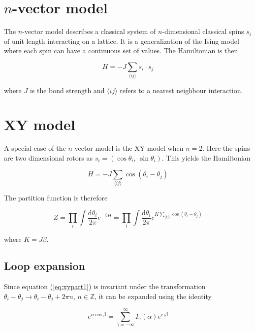 \section{$n$-vector model}
\label{sec:nVector}

The $n$-vector model describes a classical system of $n$-dimensional classical spins $s_i$ of unit length interacting on a lattice. It is a generalization of the Ising model where each spin can have a continuous set of values. The Hamiltonian is then

\begin{equation}
    H = -J\sum_{\langle ij \rangle} s_i \cdot s_j
\end{equation}

where $J$ is the bond strength and $\langle ij \rangle$ refers to a nearest neighbour interaction.

\section{XY model}
\label{sec:XYModel}

A special case of the $n$-vector model is the XY model when $n = 2$. Here the spins are two dimensional rotors as $s_i = (\cos \theta_i, \  \sin \theta_i)$. This yields the Hamiltonian

\begin{equation}
    H = - J \sum_{\langle ij \rangle} \cos(\theta_i - \theta_j)
\label{eq:xymodel}
\end{equation}

The partition function is therefore

\begin{equation}
    Z = \prod_i \int \frac{\mathrm d \theta_i}{2 \pi} e^{-\beta H} = \prod_i \int \frac{\mathrm d \theta_i}{2 \pi} e^{K \sum_{\langle ij \rangle} \cos(\theta_i - \theta_j)}
\label{eq:xypart1}
\end{equation}

where $K = J \beta$.

\subsection{Loop expansion}
\label{subsec:XYLoopexp}

Since equation (\ref{eq:xypart1}) is invariant under the transformation $\theta_i - \theta_j \rightarrow \theta_i - \theta_j + 2 \pi n$, $n \in \mathbb{Z}$, it can be expanded using the identity

\begin{equation}
    e^{\alpha \cos \beta} = \sum_{\gamma = -\infty}^{\infty} I_\gamma ( \alpha ) e^{i \gamma \beta}
\end{equation}

